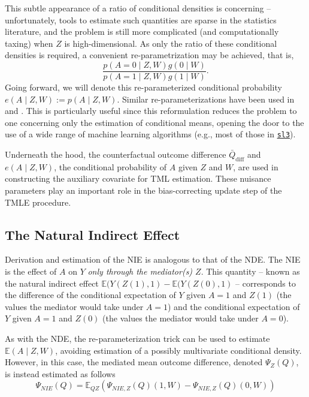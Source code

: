 \documentclass[12pt, krantz2,]{krantz}
\theoremstyle{definition}
\theoremstyle{definition}
\theoremstyle{definition}
\newcommand{\E}{\mathbb{E}}
\newcommand{\1}{\mathbbm{1}}
\begin{document}
This subtle appearance of a ratio of conditional densities is concerning --
unfortunately, tools to estimate such quantities are sparse in the statistics
literature, and the problem is still more complicated (and computationally
taxing) when \(Z\) is high-dimensional. As only the ratio of these conditional
densities is required, a convenient re-parametrization may be achieved, that is,
\begin{equation*}
  \frac{p(A = 0 \mid Z, W) g(0 \mid W)}{p(A = 1 \mid Z, W) g(1 \mid W)}.
\end{equation*}
Going forward, we will denote this re-parameterized conditional probability
\(e(A \mid Z, W) := p(A \mid Z, W)\). Similar re-parameterizations have been used
in \citet{zheng2012targeted} and \citet{tchetgen2013inverse}. This is particularly useful
since this reformulation reduces the problem to one concerning only the
estimation of conditional means, opening the door to the use of a wide range of
machine learning algorithms (e.g., most of those in
\href{https://github.com/tlverse/sl3}{\texttt{sl3}}).

Underneath the hood, the counterfactual outcome difference
\(\bar{Q}_{\text{diff}}\) and \(e(A \mid Z, W)\), the conditional probability of \(A\)
given \(Z\) and \(W\), are used in constructing the auxiliary covariate for TML
estimation. These nuisance parameters play an important role in the
bias-correcting update step of the TMLE procedure.

\hypertarget{the-natural-indirect-effect}{%
\subsection{The Natural Indirect Effect}\label{the-natural-indirect-effect}}

Derivation and estimation of the NIE is analogous to that of the NDE. The NIE
is the effect of \(A\) on \(Y\) \emph{only through the mediator(s) \(Z\)}. This quantity
-- known as the natural indirect effect \(\E(Y(Z(1), 1) - \E(Y(Z(0), 1)\) --
corresponds to the difference of the conditional expectation of \(Y\) given \(A = 1\) and \(Z(1)\) (the values the mediator would take under \(A = 1\)) and the
conditional expectation of \(Y\) given \(A = 1\) and \(Z(0)\) (the values the mediator
would take under \(A = 0\)).

As with the NDE, the re-parameterization trick can be used to estimate \(\E(A \mid Z, W)\), avoiding estimation of a possibly multivariate conditional density.
However, in this case, the mediated mean outcome difference, denoted
\(\Psi_Z(Q)\), is instead estimated as follows
\begin{equation*}
  \Psi_{NIE}(Q) = \E_{QZ}(\Psi_{NIE, Z}(Q)(1, W) - \Psi_{NIE, Z}(Q)(0, W))
\end{equation*}
\end{document}
